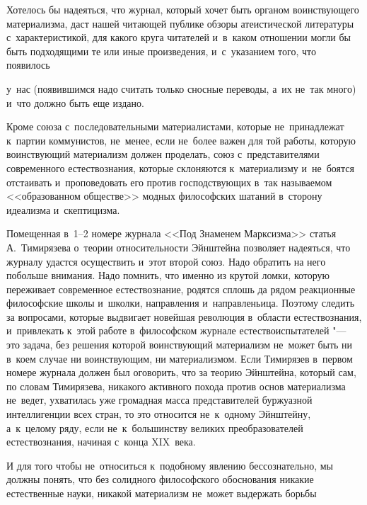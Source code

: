 Хотелось бы надеяться, что журнал, который хочет быть органом воинствующего материализма, даст нашей читающей публике обзоры атеистической литературы с~характеристикой, для какого круга читателей и~в~каком отношении могли бы быть подходящими те или иные произведения, и~с~указанием того, что появилось

у~нас (появившимся надо считать только сносные переводы, а~их не~так много) и~что должно быть еще издано.

Кроме союза с~последовательными материалистами, которые не~принадлежат к~партии коммунистов, не~менее, если не~более важен для той работы, которую воинствующий материализм должен проделать, союз с~представителями современного естествознания, которые склоняются к~материализму и~не~боятся отстаивать и~проповедовать его против господствующих в~так называемом <<образованном обществе>> модных философских шатаний в~сторону идеализма и~скептицизма.

Помещенная в~1--2 номере журнала <<Под Знаменем Марксизма>> статья А.~Тимирязева о~теории относительности Эйнштейна позволяет надеяться, что журналу удастся осуществить и~этот второй союз. Надо обратить на него побольше внимания. Надо помнить, что именно из крутой ломки, которую переживает современное естествознание, родятся сплошь да рядом реакционные философские школы и~школки, направления и~направленьица. Поэтому следить за вопросами, которые выдвигает новейшая революция в~области естествознания, и~привлекать к~этой работе в~философском журнале естествоиспытателей "--- это задача, без решения которой воинствующий материализм не~может быть ни в~коем случае ни воинствующим, ни материализмом. Если Тимирязев в~первом номере журнала должен был оговорить, что за теорию Эйнштейна, который сам, по словам Тимирязева, никакого активного похода против основ материализма не~ведет, ухватилась уже громадная масса представителей буржуазной интеллигенции всех стран, то это относится не~к~одному Эйнштейну, а~к~целому ряду, если не~к~большинству великих преобразователей естествознания, начиная с~конца XIX~века.

И для того чтобы не~относиться к~подобному явлению бессознательно, мы должны понять, что без солидного философского обоснования никакие естественные науки, никакой материализм не~может выдержать борьбы

